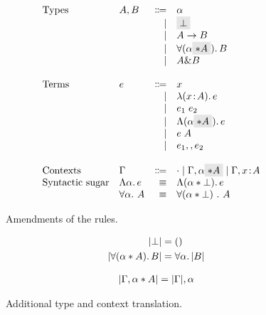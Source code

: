 \begin{figure}
  \[
    \begin{array}{l}
      \begin{array}{llrll}
        \text{Types}
        & A, B & \Coloneqq & \alpha                  & \\
        &      & \mid & \highlight {$\bot$}          & \\
        &      & \mid & A \to B                      & \\
        &      & \mid & \for {(\alpha \highlight {$\disjoint A$})} B  & \\
        &      & \mid & A \inter B                   & \\

        \\
        \text{Terms}
        & e & \Coloneqq & x                        & \\
        &   & \mid & \lam {(x \oftype A)} e          & \\
        &   & \mid & \app {e_1} {e_2}              & \\
        &   & \mid & \blam {(\alpha \highlight {$\disjoint A$})} e  & \\
        &   & \mid & \tapp e A                     & \\
        &   & \mid & e_1 \mergeop e_2              & \\

        \\
        \text{Contexts}
        & \Gamma & \Coloneqq & \cdot
                   \mid \Gamma, \alpha \highlight {$\disjoint A$}
                   \mid \Gamma, x \oftype A  & \\

        \text{Syntactic sugar} & \blam \alpha e & \equiv & \blamdis \alpha \bot e & \\
                               & \forall \alpha.~A & \equiv & \forall (\alpha * \bot)~.~A & \\
      \end{array}
    \end{array}
  \]

  \caption{Amendments of the rules.}
  \label{fig:fi-syntax-dis}
\end{figure}

\begin{figure}

  \begin{align*}
    \lvert \bot \rvert                  &= () \\
    \lvert \forall (\alpha * A).\, B \rvert  &= \forall \alpha.\, \lvert B \rvert \\
  \end{align*}


  \begin{align*}
    \lvert \Gamma, \alpha * A \rvert &= \lvert \Gamma \rvert, \alpha \\
  \end{align*}

  \caption{Additional type and context translation.}
  \label{fig:additional-type-and-context-translation}
\end{figure}

